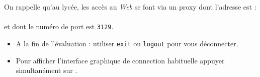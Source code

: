 \documentclass[11pt,a4paper]{article}
\begin{document}
\aide \; On rappelle qu'au lycée, les accès au \textit{Web} se font via un proxy dont l'adresse est :\\
\phantom{\aide \; }{\tt http://172.19.240.1} \\
\phantom{\aide \; }et dont le numéro de port est {\tt 3129}.


\FinListe
\medskip
\begin{tcolorbox}[title=\textcolor{black}{\faHandPointRight \; Remarques},colbacktitle=lightgray]
    \begin{itemize}
        \item A la fin de l'évaluation : utiliser {\tt exit} ou {\tt logout} pour vous déconnecter.
        \item Pour afficher l'interface graphique de connection habituelle appuyer simultanément sur .
    \end{itemize}
\end{tcolorbox}
\end{document}
